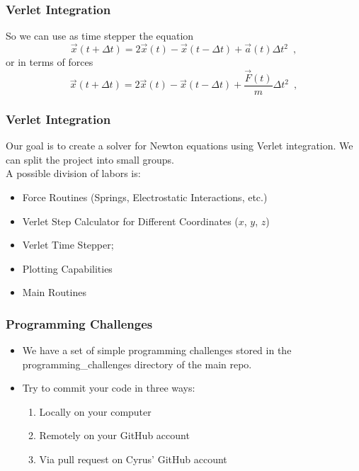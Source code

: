 \begin{frame}
\frametitle{Verlet Integration}
So we can use as time stepper the equation
\[\boxed{\vec{x}(t + \Delta t) = 2\vec{x}(t) - \vec{x}(t - \Delta t) + \vec{a}(t) \Delta t^2} \enspace ,\]
\vspace{2mm}
or in terms of forces
\[\boxed{\vec{x}(t + \Delta t) = 2\vec{x}(t) - \vec{x}(t - \Delta t) + \frac{\vec{F}(t)}{m} \Delta t^2} \enspace ,\]
\end{frame}

\begin{frame}
\frametitle{Verlet Integration}
Our goal is to create a solver for Newton equations using Verlet integration. We can split the project into small groups.\\
\vspace{2mm}
A possible division of labors is:
\begin{itemize}
\item Force Routines (Springs, Electrostatic Interactions, etc.)
\item Verlet Step Calculator for Different Coordinates ($x$, $y$, $z$)
\item Verlet Time Stepper;
\item Plotting Capabilities
\item Main Routines
\end{itemize}
\end{frame}
\note{}

\begin{frame}
\frametitle{Programming Challenges}
\begin{itemize}
\item We have a set of simple programming challenges stored in the programming\_challenges directory of the main repo.
\vspace{3mm}
\item Try to commit your code in three ways:
\begin{enumerate}
\item Locally on your computer
\item Remotely on your GitHub account
\item Via pull request on Cyrus' GitHub account
\end{enumerate}
\end{itemize}
\end{frame}

